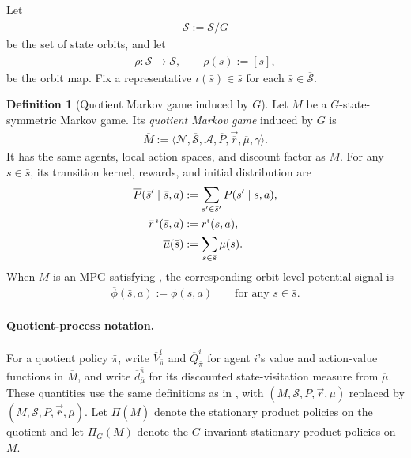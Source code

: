 \documentclass{article}
\theoremstyle{plain}
\theoremstyle{definition}
\newtheorem{definition}[theorem]{Definition}
\theoremstyle{remark}
\newcommand{\N}{\mathcal{N}}
\newcommand{\St}{\mathcal{S}}
\newcommand{\Ac}{\mathcal{A}}
\newcommand{\orbit}[1]{[#1]}
\newcommand{\quotient}[1]{\overline{#1}}
\newcommand{\Vbar}{\overline{V}}
\newcommand{\Qbar}{\overline{Q}}
\newcommand{\dbar}{\overline{d}}
\begin{document}
Let
\begin{align*}
  \quotient\St:=\St/G
\end{align*}
be the set of state orbits, and let
\begin{align*}
  \rho:\St\to\quotient\St,
  \qquad
  \rho(s):=\orbit{s},
\end{align*}
be the orbit map. Fix a representative
$\iota(\bar s)\in\bar s$ for each $\bar s\in\quotient\St$.

\begin{definition}[Quotient Markov game induced by $G$]
\label{def:quotient-mg}
Let $M$ be a $G$-state-symmetric Markov game. Its \emph{quotient Markov game}
induced by $G$ is
\begin{align*}
  \quotient M
  :=
  \langle
    \N,\quotient\St,\Ac,\quotient P,\vec{\quotient r},
    \quotient\mu,\gamma
  \rangle.
\end{align*}
It has the same agents, local action spaces, and discount factor as $M$. For any
$s\in\bar s$, its transition kernel, rewards, and initial distribution are
\begin{align}
  \quotient P(\bar s'\mid\bar s,a)
  &:=
  \sum_{s'\in\bar s'}P(s'\mid s,a),
  \label{eq:quotient-transition}\\
  \quotient r^{\,i}(\bar s,a)
  &:=
  r^i(s,a),
  \label{eq:quotient-reward}\\
  \quotient\mu(\bar s)
  &:=
  \sum_{s\in\bar s}\mu(s).
  \notag
\end{align}
When $M$ is an MPG satisfying , the corresponding
orbit-level potential signal is
\begin{align}
  \quotient\phi(\bar s,a)
  :=
  \phi(s,a)
  \qquad
  \text{for any $s\in\bar s$.}
  \label{eq:quotient-potential}
\end{align}
\end{definition}

\paragraph{Quotient-process notation.}
For a quotient policy $\bar\pi$, write
$\Vbar^i_{\bar\pi}$ and $\Qbar^i_{\bar\pi}$ for agent $i$'s value and
action-value functions in $\quotient M$, and write
$\dbar^{\bar\pi}_{\quotient\mu}$ for its discounted state-visitation measure
from $\quotient\mu$. These quantities use the same definitions as in
, with
$(M,\St,P,\vec r,\mu)$ replaced by
$(\quotient M,\quotient\St,\quotient P,\vec{\quotient r},\quotient\mu)$.
Let $\Pi(\quotient M)$ denote the stationary product policies on the quotient and
let $\Pi_G(M)$ denote the $G$-invariant stationary product policies on $M$.
\end{document}
